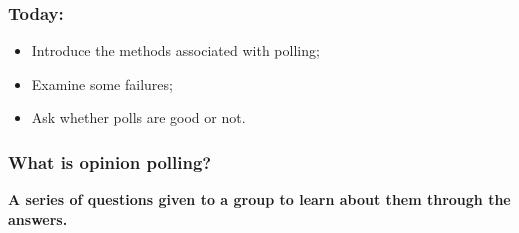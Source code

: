 \documentclass[aspectratio=169]{beamer}
\theoremstyle{principle}
\begin{document}
\begin{frame}
\frametitle{Today:}

\begin{itemize}
\item Introduce the methods associated with polling;
\bigskip
\bigskip
\bigskip

\item Examine some failures;
\bigskip
\bigskip
\bigskip

\item Ask whether polls are good or not.

\end{itemize}

\end{frame}

%
%
%
%
%

\begin{frame}
\frametitle{What is opinion polling?}

\begin{center}
\Huge \textbf{A series of questions given to a group to learn about them through the answers.}
\end{center}

\end{frame}
\end{document}
